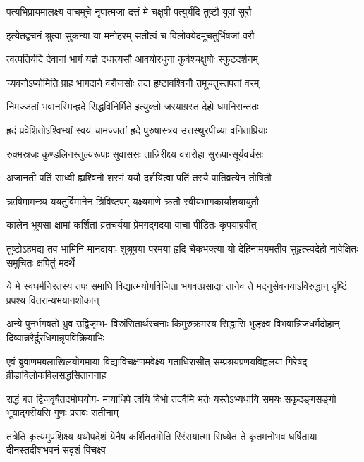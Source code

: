 \twolineshloka
{पत्यभिप्रायमालक्ष्य वाचमूचे नृपात्मजा}
{दत्तं मे चक्षुषी पत्युर्यदि तुष्टौ युवां सुरौ}%

\twolineshloka
{इत्येतद्वचनं श्रुत्वा सुकन्या या मनोहरम्}
{सतीत्वं च विलोक्येदमूचतुर्भिषजां वरौ}%

\twolineshloka
{त्वत्पतिर्यदि देवानां भागं यज्ञे दधात्यसौ}
{आवयोरधुना कुर्वश्चक्षुषोः स्फुटदर्शनम्}%

\twolineshloka
{च्यवनोऽप्योमिति प्राह भागदाने वरौजसोः}
{तदा हृष्टावश्विनौ तमूचतुस्तपतां वरम्}%

\twolineshloka
{निमज्जतां भवानस्मिन्ह्रदे सिद्धविनिर्मिते}
{इत्युक्तो जरयाग्रस्त देहो धमनिसन्ततः}%

\twolineshloka
{ह्रदं प्रवेशितोऽश्विभ्यां स्वयं चामज्जतां ह्रदे}
{पुरुषास्त्रय उत्तस्थुरपीच्या वनिताप्रियाः}%

\twolineshloka
{रुक्मस्रजः कुण्डलिनस्तुल्यरूपाः सुवाससः}
{तान्निरीक्ष्य वरारोहा सुरूपान्सूर्यवर्चसः}%

\twolineshloka
{अजानती पतिं साध्वी ह्यश्विनौ शरणं ययौ}
{दर्शयित्वा पतिं तस्यै पातिव्रत्येन तोषितौ}%

\twolineshloka
{ऋषिमामन्त्र्य ययतुर्विमानेन त्रिविष्टपम्}
{यक्ष्यमाणे क्रतौ स्वीयभागकार्याशयायुतौ}%

\twolineshloka
{कालेन भूयसा क्षामां कर्शितां व्रतचर्यया}
{प्रेमगद्गदया वाचा पीडितः कृपयाब्रवीत्}%

\fourlineindentedshloka
{तुष्टोऽहमद्य तव भामिनि मानदायाः}
{शुश्रूषया परमया हृदि चैकभक्त्या}
{यो देहिनामयमतीव सुहृत्स्वदेहो}
{नावेक्षितः समुचितः क्षपितुं मदर्थे}%

\fourlineindentedshloka
{ये मे स्वधर्मनिरतस्य तपः समाधि}
{विद्यात्मयोगविजिता भगवत्प्रसादाः}
{तानेव ते मदनुसेवनयाऽविरुद्धान्}
{दृष्टिं प्रपश्य वितराम्यभयानशोकान्}%

\fourlineindentedshloka
{अन्ये पुनर्भगवतो भ्रुव उद्विजृम्भ-}
{विस्रंसितार्थरचनाः किमुरुक्रमस्य}
{सिद्धासि भुङ्क्ष्व विभवान्निजधर्मदोहान्}
{दिव्यान्नरैर्दुरधिगान्नृपविक्रियाभिः}%

\fourlineindentedshloka
{एवं ब्रुवाणमबलाखिलयोगमाया}
{विद्याविचक्षणमवेक्ष्य गताधिरासीत्}
{सम्प्रश्रयप्रणयविह्वलया गिरेषद्}
{व्रीडाविलोकविलसद्धसिताननाह}%


\fourlineindentedshloka
{राद्धं बत द्विजवृषैतदमोघयोग-}
{मायाधिपे त्वयि विभो तदवैमि भर्तः}
{यस्तेऽभ्यधायि समयः सकृदङ्गसङ्गो}
{भूयाद्गरीयसि गुणः प्रसवः सतीनाम्}%

\fourlineindentedshloka
{तत्रेति कृत्यमुपशिक्ष्य यथोपदेशं}
{येनैष कर्शिततमोति रिरंसयात्मा}
{सिध्येत ते कृतमनोभव धर्षिताया}
{दीनस्तदीशभवनं सदृशं विचक्ष्व}%

